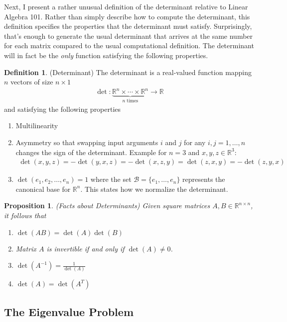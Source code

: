 \documentclass[12pt]{article}
\theoremstyle{plain}
\newtheorem{prop}[thm]{Proposition}
\theoremstyle{definition}
\newtheorem{defn}[thm]{Definition}
\theoremstyle{remark}
\newcommand{\R}{\mathbb{R}}
\begin{document}
Next, I present a rather unusual definition of the determinant relative
to Linear Algebra 101. Rather than simply describe how to compute the
determinant, this definition specifies the properties that the
determinant must satisfy. Surprisingly, that's enough to generate the
usual determinant that arrives at the same number for each matrix
compared to the usual computational definition. The determinant will in
fact be the \emph{only} function satisfying the following properties.

\begin{defn}{(Determinant)}
The determinant is a real-valued function mapping $n$ vectors of size
$n\times 1$
\begin{align*}
  \det: \underbrace{\R^n \times \cdots \times \R^n}_{n \;\text{times}}
  \rightarrow \R
\end{align*}
and satisfying the following properties
\begin{enumerate}
  \item Multilinearity
  \item Asymmetry so that swapping input arguments $i$ and $j$ for any
    $i,j=1,\ldots,n$ changes the sign of the determinant. Example for
    $n=3$ and $x,y,z\in \R^3$:
    \begin{align*}
      \det(x,y,z) = -\det(y,x,z) = - \det(x,z,y)
      = \det(z,x,y) = -\det(z,y,x)
    \end{align*}
  \item $\det(e_1,e_2,\ldots,e_n)=1$ where the set
    $\mathcal{B}=\{e_1,\ldots,e_n\}$ represents the canonical base for
    $\R^n$. This states how we normalize the determinant.
\end{enumerate}
\end{defn}


\begin{prop}{\emph{(Facts about Determinants)}}
Given square matrices $A,B\in \R^{n\times n}$, it follows that
\begin{enumerate}
  \item $\det(AB) = \det(A) \det(B)$
  \item Matrix $A$ is invertible if and only if $\det(A) \neq 0$.
  \item $\det(A^{-1}) = \frac{1}{\det(A)}$
  \item $\det(A) = \det(A^T)$
\end{enumerate}
\end{prop}

\subsection{The Eigenvalue Problem}
\end{document}
